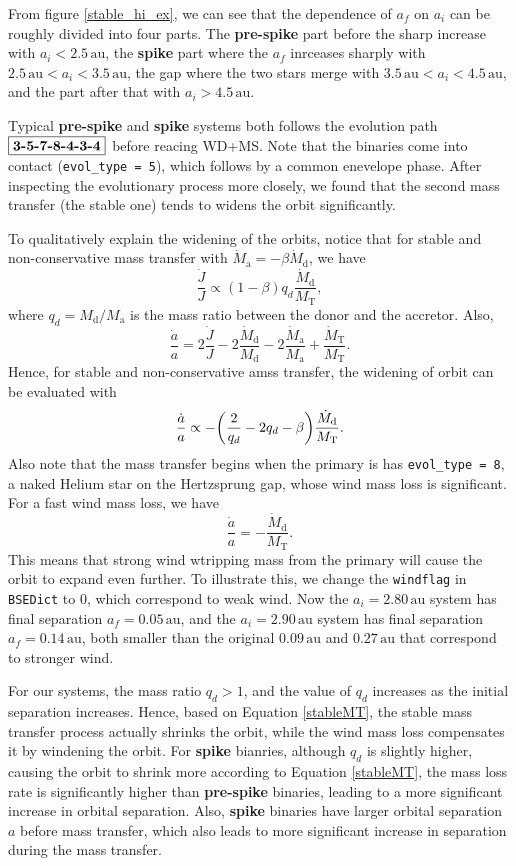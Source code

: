 \documentclass[12pt]{article}
\newcommand{\au}{\, \mathrm{au}}
\newcommand{\Md}{M_{\mathrm{d}}}
\newcommand{\MT}{M_{\mathrm{T}}}
\newcommand{\Ma}{M_{\mathrm{a}}}
\begin{document}
From figure \ref{stable_hi_ex}, we can see that the dependence of $a_f$ on $a_i$ can be roughly divided into four parts. The \textbf{pre-spike} part before the sharp increase with $a_i < 2.5 \au$, the \textbf{spike} part where the $a_f$ inrceases sharply with $2.5 \au < a_i < 3.5 \au$, the gap where the two stars merge with $3.5 \au < a_i < 4.5 \au$, and the part after that with $a_i > 4.5 \au$.

Typical \textbf{pre-spike} and \textbf{spike} systems both follows the evolution path $\boxed{\text{\textbf{3-5-7-8-4-3-4}}}$ before reacing WD+MS. Note that the binaries come into contact (\verb|evol_type = 5|), which follows by a common enevelope phase. After inspecting the evolutionary process more closely, we found that the second mass transfer (the stable one) tends to widens the orbit significantly. 

To qualitatively explain the widening of the orbits, notice that for stable and non-conservative mass transfer with $\dot \Ma = - \beta \dot \Md$, we have
\[
  \frac{\dot J}{J} \propto (1 - \beta) q_d \frac{\dot \Md}{\MT},
\]
where $q_d = \Md / \Ma$ is the mass ratio between the donor and the accretor. Also,
\[
  \frac{\dot a}{a} = 2 \frac{\dot J}{J} - 2 \frac{\dot \Md}{\Md} - 2 \frac{\dot \Ma}{\Ma} + \frac{\dot \MT}{\MT}.
\]
Hence, for stable and non-conservative amss transfer, the widening of orbit can be evaluated with
\begin{equation}
  \frac{\dot a}{a} \propto - \qty(\frac{2}{q_d} - 2q_d - \beta) \frac{\dot \Md}{\MT}.
  \label{stableMT}
\end{equation}
Also note that the mass transfer begins when the primary is has \verb|evol_type = 8|, a naked Helium star on the Hertzsprung gap, whose wind mass loss is significant. For a fast wind mass loss, we have
\begin{equation}
  \frac{\dot a}{a} = - \frac{\dot \Md}{\MT}.
  \label{wind}
\end{equation}
This means that strong wind wtripping mass from the primary will cause the orbit to expand even further. To illustrate this, we change the \verb|windflag| in \verb|BSEDict| to 0, which correspond to weak wind. Now the $a_i = 2.80 \au$ system has final separation $a_f = 0.05 \au$, and the $a_i = 2.90 \au$ system has final separation $a_f = 0.14 \au$, both smaller than the original $0.09 \au$ and $0.27\au$ that correspond to stronger wind.

For our systems, the mass ratio $q_d > 1$, and the value of $q_d$ increases as the initial separation increases. Hence, based on Equation \ref{stableMT}, the stable mass transfer process actually shrinks the orbit, while the wind mass loss compensates it by windening the orbit. For \textbf{spike} bianries, although $q_d$ is slightly higher, causing the orbit to shrink more according to Equation \ref{stableMT}, the mass loss rate is significantly higher than \textbf{pre-spike} binaries, leading to a more significant increase in orbital separation. Also, \textbf{spike} binaries have larger orbital separation $a$ before mass transfer, which also leads to more significant increase in separation during the mass transfer.
\end{document}
